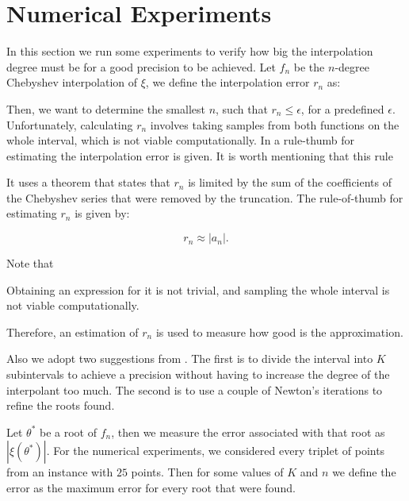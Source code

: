 \section{Numerical Experiments}

In this section we run some experiments to verify how big the interpolation degree must be for a good precision to be achieved. 
Let $f_n$ be the $n$-degree Chebyshev interpolation of $\xi$, we define the interpolation error $r_n$ as:



Then, we want to determine the smallest $n$, such that $r_n \le \epsilon$, for a predefined $\epsilon$. Unfortunately, calculating $r_n$ involves taking samples from both functions on the whole interval, which is not viable computationally. In  a rule-thumb for estimating the interpolation error is given. It is worth mentioning that this rule 

It uses a theorem that states that $r_n$ is limited by the sum of the coefficients of the Chebyshev series that were removed by the truncation. The rule-of-thumb for estimating $r_n$ is given by:

\begin{equation}
r_n \approx |a_n|.
\end{equation}

Note that 

Obtaining an expression for it is not trivial, and sampling the whole interval is not viable computationally. 

Therefore, an estimation of $r_n$ is used to measure how good is the approximation.

Also we adopt two suggestions from \cite{boyd:2013}. The first is to divide the interval into $K$ subintervals to achieve a precision without having to increase the degree of the interpolant too much. The second is to use a couple of Newton's iterations to refine the roots found. 

Let $\theta^*$ be a root of $f_n$, then we measure the error associated with that root as $|\xi(\theta^*)|$. For the numerical experiments, we considered every triplet of points from an instance with $25$ points. Then for some values of $K$ and $n$ we define the error as the maximum error for every root that were found.

